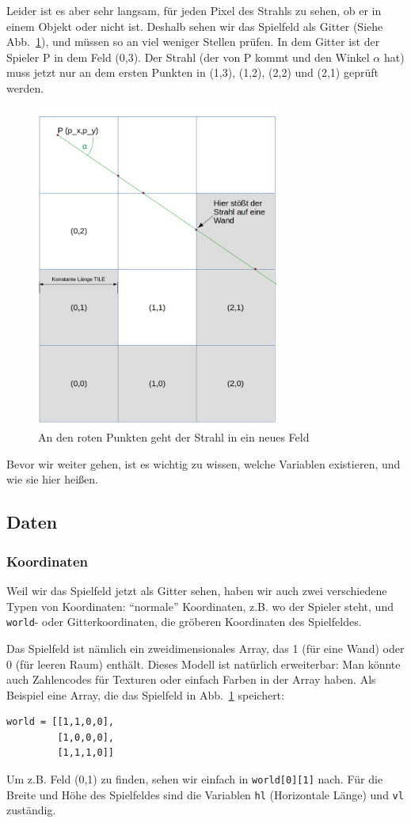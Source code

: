 \documentclass[a4paper,12pt]{report}
\begin{document}
Leider ist es aber sehr langsam, f\"ur jeden Pixel des Strahls zu sehen, ob er in einem Objekt oder nicht ist. Deshalb sehen wir das Spielfeld als Gitter (Siehe Abb.~\ref{fig:grid}), und m\"ussen so an viel weniger Stellen pr\"ufen. In dem Gitter ist der Spieler P in dem Feld (0,3). Der Strahl (der von P kommt und den Winkel $\alpha$ hat) muss jetzt nur an dem ersten Punkten in (1,3), (1,2), (2,2) und (2,1) gepr\"uft werden.
\begin{figure}[htbp]
        \centering
        \includegraphics[width=8cm]{grid.png} 
        \caption{An den roten Punkten geht der Strahl in ein neues Feld}
        \label{fig:grid}
\end{figure}

Bevor wir weiter gehen, ist es wichtig zu wissen, welche Variablen existieren, und wie sie hier hei\ss en.

\subsection{Daten}
\subsubsection{Koordinaten}
Weil wir das Spielfeld jetzt als Gitter sehen, haben wir auch zwei verschiedene Typen von Koordinaten: ``normale'' Koordinaten, z.B. wo der Spieler steht, und \texttt{world}- oder Gitterkoordinaten, die gr\"oberen Koordinaten des Spielfeldes.

Das Spielfeld ist n\"amlich ein zweidimensionales Array, das 1 (f\"ur eine Wand) oder 0 (f\"ur leeren Raum) enth\"alt. Dieses Modell ist nat\"urlich erweiterbar: Man k\"onnte auch Zahlencodes f\"ur Texturen oder einfach Farben in der Array haben. Als Beispiel eine Array, die das Spielfeld in Abb.~\ref{fig:grid} speichert:
\begin{Verbatim}[baselinestretch=1.0, xleftmargin=1cm]
world = [[1,1,0,0],
         [1,0,0,0],
         [1,1,1,0]]
\end{Verbatim}
Um z.B. Feld (0,1) zu finden, sehen wir einfach in \texttt{world[0][1]} nach. F\"ur die Breite und H\"ohe des Spielfeldes sind die Variablen \texttt{hl} (Horizontale L\"ange) und \texttt{vl} zust\"andig. 
\end{document}
